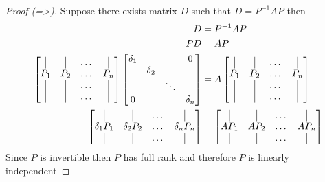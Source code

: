 \documentclass[12pt]{article}
\begin{document}
\begin{proof}[Proof (=>)]
	Suppose there exists matrix $D$ such that $D = P^{-1}AP$ then
	\begin{align*}
	D &= P^{-1}AP\\
	PD &= AP\\
	\left[
	\begin{matrix}
		\vline &\vline&\dots&\vline\\
		P_1 & P_2 & \dots& P_n\\
		\vline &\vline&\dots&\vline\\
		\vline &\vline&\dots&\vline\\
	\end{matrix}
	\right]
	\left[
	\begin{matrix}
	\delta_1 & &  & 0\\
	 & \delta_2& &	\\
	&  & \ddots &\\
	0 & & & \delta_n
	\end{matrix}
	\right]
	&= A\left[
	\begin{matrix}
	\vline &\vline&\dots&\vline\\
	P_1 & P_2 & \dots& P_n\\
	\vline &\vline&\dots&\vline\\
	\vline &\vline&\dots&\vline\\
	\end{matrix}
	\right]\\
	\left[
	\begin{matrix}
	\vline &\vline&\dots&\vline\\
	\delta_1 P_1 & \delta_2P_2 & \dots& \delta_nP_n\\
	\vline &\vline&\dots&\vline\\
	\end{matrix}
	\right] &= \left[
	\begin{matrix}
	\vline &\vline&\dots&\vline\\
	AP_1 & AP_2 & \dots& AP_n\\
	\vline &\vline&\dots&\vline\\
	\end{matrix}
	\right]
	\end{align*}
	Since $P$ is invertible then $P$ has full rank and therefore $P$ is linearly independent
\end{proof}
\end{document}

